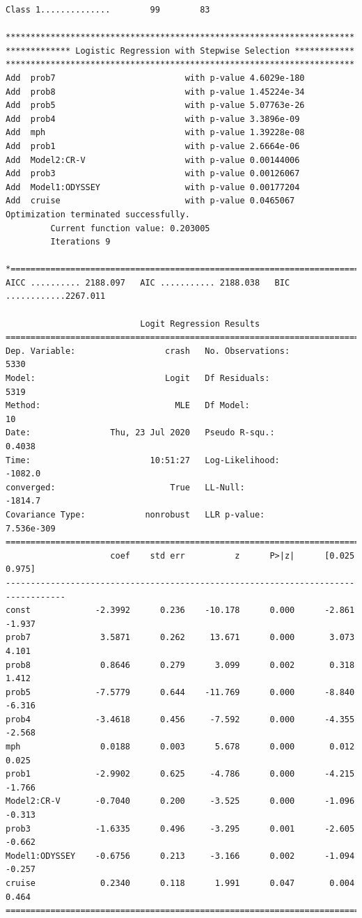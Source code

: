 \documentclass[12pt]{article}
\begin{document}
\begin{verbatim}
Class 1..............        99        83

**********************************************************************
************* Logistic Regression with Stepwise Selection ************
**********************************************************************
Add  prob7                          with p-value 4.6029e-180
Add  prob8                          with p-value 1.45224e-34
Add  prob5                          with p-value 5.07763e-26
Add  prob4                          with p-value 3.3896e-09
Add  mph                            with p-value 1.39228e-08
Add  prob1                          with p-value 2.6664e-06
Add  Model2:CR-V                    with p-value 0.00144006
Add  prob3                          with p-value 0.00126067
Add  Model1:ODYSSEY                 with p-value 0.00177204
Add  cruise                         with p-value 0.0465067
Optimization terminated successfully.
         Current function value: 0.203005
         Iterations 9

*=============================================================================*
AICC .......... 2188.097   AIC ........... 2188.038   BIC ............2267.011

                           Logit Regression Results                           
==============================================================================
Dep. Variable:                  crash   No. Observations:                 5330
Model:                          Logit   Df Residuals:                     5319
Method:                           MLE   Df Model:                           10
Date:                Thu, 23 Jul 2020   Pseudo R-squ.:                  0.4038
Time:                        10:51:27   Log-Likelihood:                -1082.0
converged:                       True   LL-Null:                       -1814.7
Covariance Type:            nonrobust   LLR p-value:                7.536e-309
==================================================================================
                     coef    std err          z      P>|z|      [0.025      0.975]
----------------------------------------------------------------------------------
const             -2.3992      0.236    -10.178      0.000      -2.861      -1.937
prob7              3.5871      0.262     13.671      0.000       3.073       4.101
prob8              0.8646      0.279      3.099      0.002       0.318       1.412
prob5             -7.5779      0.644    -11.769      0.000      -8.840      -6.316
prob4             -3.4618      0.456     -7.592      0.000      -4.355      -2.568
mph                0.0188      0.003      5.678      0.000       0.012       0.025
prob1             -2.9902      0.625     -4.786      0.000      -4.215      -1.766
Model2:CR-V       -0.7040      0.200     -3.525      0.000      -1.096      -0.313
prob3             -1.6335      0.496     -3.295      0.001      -2.605      -0.662
Model1:ODYSSEY    -0.6756      0.213     -3.166      0.002      -1.094      -0.257
cruise             0.2340      0.118      1.991      0.047       0.004       0.464
==================================================================================


\end{verbatim}
\end{document}
